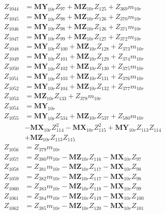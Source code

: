 \begin{multicols}{2}
\begin{align}
Z_{1044} &= \mathbf{MY}_{10r}Z_{97} + \mathbf{MZ}_{10r}Z_{125} + Z_{369}m_{10r} \nonumber \\
Z_{1045} &= \mathbf{MY}_{10r}Z_{98} + \mathbf{MZ}_{10r}Z_{126} + Z_{370}m_{10r} \nonumber \\
Z_{1046} &= \mathbf{MY}_{10r}Z_{98} + \mathbf{MZ}_{10r}Z_{126} + Z_{371}m_{10r} \nonumber \\
Z_{1047} &= \mathbf{MY}_{10r}Z_{99} + \mathbf{MZ}_{10r}Z_{127} + Z_{372}m_{10r} \nonumber \\
Z_{1048} &= \mathbf{MY}_{10r}Z_{100} + \mathbf{MZ}_{10r}Z_{128} + Z_{373}m_{10r} \nonumber \\
Z_{1049} &= \mathbf{MY}_{10r}Z_{101} + \mathbf{MZ}_{10r}Z_{129} + Z_{374}m_{10r} \nonumber \\
Z_{1050} &= \mathbf{MY}_{10r}Z_{102} + \mathbf{MZ}_{10r}Z_{130} + Z_{375}m_{10r} \nonumber \\
Z_{1051} &= \mathbf{MY}_{10r}Z_{103} + \mathbf{MZ}_{10r}Z_{131} + Z_{376}m_{10r} \nonumber \\
Z_{1052} &= \mathbf{MY}_{10r}Z_{104} + \mathbf{MZ}_{10r}Z_{132} + Z_{377}m_{10r} \nonumber \\
Z_{1053} &= \mathbf{MZ}_{10r}Z_{133} + Z_{378}m_{10r} \nonumber \\
Z_{1054} &= \mathbf{MY}_{10r} \nonumber \\
Z_{1055} &= \mathbf{MY}_{10r}Z_{534} + \mathbf{MZ}_{10r}Z_{537} + Z_{580}m_{10r}  \nonumber \\
&- \mathbf{MX}_{10r}Z_{114}^2 - \mathbf{MX}_{10r}Z_{115}^2 + \mathbf{MY}_{10r}Z_{113}Z_{114}  \nonumber \\
&+ \mathbf{MZ}_{10r}Z_{113}Z_{115} \nonumber \\
Z_{1056} &= Z_{379}m_{10r} \nonumber \\
Z_{1057} &= Z_{380}m_{10r} - \mathbf{MZ}_{10r}Z_{116} - \mathbf{MX}_{10r}Z_{97} \nonumber \\
Z_{1058} &= Z_{381}m_{10r} - \mathbf{MZ}_{10r}Z_{117} - \mathbf{MX}_{10r}Z_{98} \nonumber \\
Z_{1059} &= Z_{382}m_{10r} - \mathbf{MZ}_{10r}Z_{117} - \mathbf{MX}_{10r}Z_{98} \nonumber \\
Z_{1060} &= Z_{383}m_{10r} - \mathbf{MZ}_{10r}Z_{118} - \mathbf{MX}_{10r}Z_{99} \nonumber \\
Z_{1061} &= Z_{384}m_{10r} - \mathbf{MZ}_{10r}Z_{119} - \mathbf{MX}_{10r}Z_{100} \nonumber \\
Z_{1062} &= Z_{385}m_{10r} - \mathbf{MZ}_{10r}Z_{120} - \mathbf{MX}_{10r}Z_{101} \nonumber \\

\end{align}
\end{multicols}
